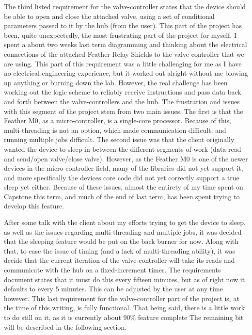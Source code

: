 \documentclass[onecolumn, draftclsnofoot,10pt, compsoc]{IEEEtran}
\begin{document}
The third listed requirement for the valve-controller states that the device should be able to open and close the attached valve, using a set of conditional parameters passed to it by the hub (from the user).
This part of the project has been, quite unexpectedly, the most frustrating part of the project for myself.
I spent a about two weeks last term diagramming and thinking about the electrical connections of the attached Feather Relay Shields to the valve-controller that we are using.
This part of this requirement was a little challenging for me as I have no electrical engineering experience, but it worked out alright without me blowing up anything or burning down the lab.
However, the real challenge has been working out the logic scheme to reliably receive instructions and pass data back and forth between the valve-controllers and the hub.
The frustration and issues with this segment of the project stem from two main issues.
The first is that the Feather M0, as a micro-controller, is a single-core processor.
Because of this, multi-threading is not an option, which made communication difficult, and running multiple jobs difficult.
The second issue was that the client originally wanted the device to sleep in between the different segments of work (data-read and send/open valve/close valve).
However, as the Feather M0 is one of the newer devices in the micro-controller field, many of the libraries did not yet support it, and more specifically the devices core code did not yet correctly support a true sleep yet either.
Because of these issues, almost the entirety of my time spent on Capstone this term, and much of the end of last term, has been spent trying to develop this feature.

After some talk with the client about my efforts trying to get the device to sleep, as well as the issues regarding multi-threading and multiple jobs, it was decided that the sleeping feature would be put on the back burner for now.
Along with that, to ease the issue of timing (and a lack of multi-threading ability), it was decide that the current iteration of the valve-controller will take its reads and communicate with the hub on a fixed-increment timer.
The requirements document states that it must do this every fifteen minutes, but as of right now it defaults to every 5 minutes.
This can be adjusted by the user at any time however.
This last requirement for the valve-controller part of the project is, at the time of this writing, is fully functional.
That being said, there is a little work to do still on it, as it is currently about 90\% feature complete
The remaining bit will be described in the following section.
\end{document}
